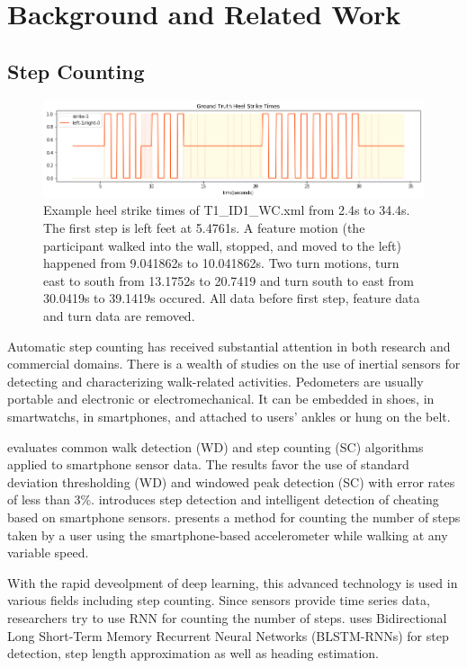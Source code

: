\documentclass[11pt]{article}
\begin{document}
{\section{Background and Related Work}

\subsection{Step Counting}

\begin{figure}[ht]
\centering
\includegraphics[scale=0.5]{ground_truth_2}
\caption{Example heel strike times of T1\_ID1\_WC.xml from 2.4s to 34.4s. The first step is left feet at 5.4761s. A feature motion (the participant walked into the wall, stopped, and moved to the left) happened from 9.041862s to 10.041862s. Two turn motions, turn east to south from 13.1752s to 20.7419 and turn south to east from 30.0419s to 39.1419s occured. All data before first step, feature data and turn data are removed.}
\label{fig:ground_truth}
\end{figure}


Automatic step counting has received substantial attention in both research and commercial domains. There is a wealth of studies on the use of inertial sensors for detecting and characterizing walk-related activities. Pedometers are usually portable and electronic or electromechanical. It can be embedded in shoes, in smartwatchs, in  smartphones, and attached to users' ankles or hung on the belt.

\cite{brajdic2013walk} evaluates common walk detection (WD) and step counting (SC) algorithms applied to smartphone sensor data. The results favor the use of standard deviation thresholding (WD) and windowed peak detection (SC) with error rates of less than 3\%.
\cite{tomlein2012advanced} introduces step detection and intelligent detection of cheating based on smartphone sensors.
\cite{naqvib2012step} presents a method for counting the number of steps taken by a user using the smartphone-based accelerometer while walking at any variable speed.

With the rapid deveolpment of deep learning, this advanced technology is used in various fields including step counting. Since sensors provide time series data, researchers try to use RNN for counting the number of steps. \cite{edel2015advanced} uses Bidirectional Long Short-Term Memory Recurrent Neural Networks (BLSTM-RNNs) for step detection, step length approximation as well as heading estimation.

}
\end{document}
